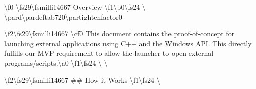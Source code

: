 \textbackslash{}f0{\bfseries{}} \textbackslash{}fs29\textbackslash{}fsmilli14667 Overview \textbackslash{}f1\textbackslash{}b0\textbackslash{}fs24 \textbackslash{} \textbackslash{}pard\textbackslash{}pardeftab720\textbackslash{}partightenfactor0

\textbackslash{}f2\textbackslash{}fs29\textbackslash{}fsmilli14667 \textbackslash{}cf0 This document contains the proof-\/of-\/concept for launching external applications using C++ and the Windows API. This directly fulfills our MVP requirement to allow the launcher to open external programs/\+scripts.\textbackslash{}\textquotesingle{}a0 \textbackslash{}f1\textbackslash{}fs24 \textbackslash{} \textbackslash{}

\textbackslash{}f2\textbackslash{}fs29\textbackslash{}fsmilli14667 \#\# How it Works \textbackslash{}f1\textbackslash{}fs24 \textbackslash{}

